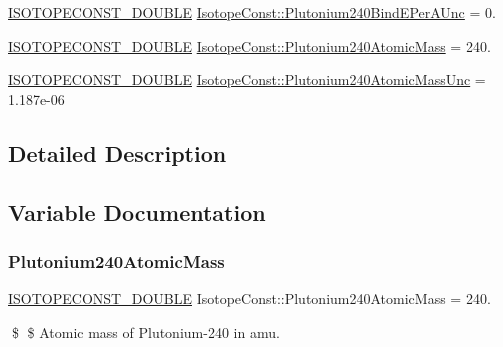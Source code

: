 \begin{DoxyCompactItemize}
\mbox{\hyperlink{group___isotope_const-_macros_ga8f45a7272ce02c0b4c65c44636ed719a}{I\+S\+O\+T\+O\+P\+E\+C\+O\+N\+S\+T\+\_\+\+D\+O\+U\+B\+LE}} \mbox{\hyperlink{group___isotope_const-_plutonium-_pu240_ga24b37e810da8048c94c110ab050fee58}{Isotope\+Const\+::\+Plutonium240\+Bind\+E\+Per\+A\+Unc}} = 0.
\item 
\mbox{\hyperlink{group___isotope_const-_macros_ga8f45a7272ce02c0b4c65c44636ed719a}{I\+S\+O\+T\+O\+P\+E\+C\+O\+N\+S\+T\+\_\+\+D\+O\+U\+B\+LE}} \mbox{\hyperlink{group___isotope_const-_plutonium-_pu240_gaf96a5256b0f6a6d97ed3ba20f8e63676}{Isotope\+Const\+::\+Plutonium240\+Atomic\+Mass}} = 240.
\item 
\mbox{\hyperlink{group___isotope_const-_macros_ga8f45a7272ce02c0b4c65c44636ed719a}{I\+S\+O\+T\+O\+P\+E\+C\+O\+N\+S\+T\+\_\+\+D\+O\+U\+B\+LE}} \mbox{\hyperlink{group___isotope_const-_plutonium-_pu240_ga58a2491db20a62efed9262360d74dbc8}{Isotope\+Const\+::\+Plutonium240\+Atomic\+Mass\+Unc}} = 1.\+187e-\/06
\end{DoxyCompactItemize}


\subsection{Detailed Description}


\subsection{Variable Documentation}
\mbox{\label{group___isotope_const-_plutonium-_pu240_gaf96a5256b0f6a6d97ed3ba20f8e63676}} 
\subsubsection{\texorpdfstring{Plutonium240\+Atomic\+Mass}{Plutonium240AtomicMass}}
{\footnotesize\ttfamily \mbox{\hyperlink{group___isotope_const-_macros_ga8f45a7272ce02c0b4c65c44636ed719a}{I\+S\+O\+T\+O\+P\+E\+C\+O\+N\+S\+T\+\_\+\+D\+O\+U\+B\+LE}} Isotope\+Const\+::\+Plutonium240\+Atomic\+Mass = 240.}

\$ \$ Atomic mass of Plutonium-\/240 in amu. \mbox{\label{group___isotope_const-_plutonium-_pu240_ga58a2491db20a62efed9262360d74dbc8}} 
